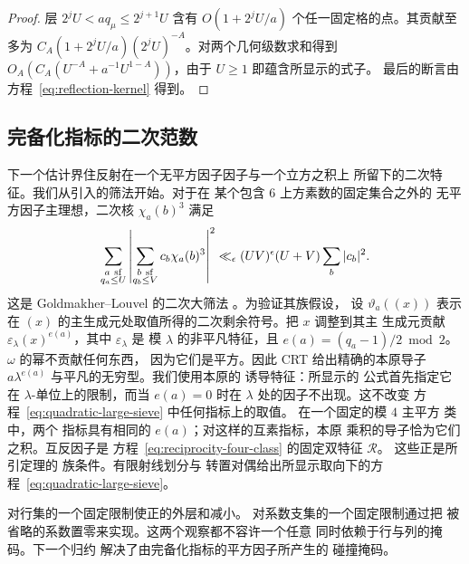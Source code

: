 \begin{proof}
层 $2^jU<a q_\mu\le2^{j+1}U$ 含有
$O(1+2^jU/a)$ 个任一固定格的点。其贡献至多为
$C_A(1+2^jU/a)(2^jU)^{-A}$。对两个几何级数求和得到
$O_A(C_A(U^{-A}+a^{-1}U^{1-A}))$，由于 $U\ge1$ 即蕴含所显示的式子。
最后的断言由方程~\eqref{eq:reflection-kernel} 得到。
\end{proof}

\subsection{完备化指标的二次范数}

下一个估计界住反射在一个无平方因子因子与一个立方之积上
所留下的二次特征。我们从引入的筛法开始。对于在
某个包含 \(6\) 上方素数的固定集合之外的
无平方因子主理想，二次核 \(\chi_a(b)^3\) 满足
\begin{equation}\label{eq:quadratic-large-sieve}
 \sum_{\substack{a\ {\rm sf}\\q_a\le U}}
 \left|\sum_{\substack{b\ {\rm sf}\\q_b\le V}}
             c_b\chi_a(b)^3\right|^2
 \ll_\epsilon (UV)^\epsilon(U+V)\sum_b|c_b|^2.
\end{equation}
这是 Goldmakher--Louvel 的二次大筛法
\cite[定义 1 与定理 1.1]{GL}。为验证其族假设，
设 \(\vartheta_a((x))\) 表示在
\((x)\) 的主生成元处取值所得的二次剩余符号。把 \(x\) 调整到其主
生成元贡献
\(\varepsilon_\lambda(x)^{e(a)}\)，其中 \(\varepsilon_\lambda\) 是
模 \(\lambda\) 的非平凡特征，且
\(e(a)=(q_a-1)/2\bmod2\)。\(\omega\) 的幂不贡献任何东西，
因为它们是平方。因此 CRT 给出精确的本原导子
\(a\lambda^{e(a)}\) 与平凡的无穷型。我们使用本原的
诱导特征：所显示的
公式首先指定它在 \(\lambda\)-单位上的限制，而当
\(e(a)=0\) 时在 \(\lambda\) 处的因子不出现。这不改变
方程~\eqref{eq:quadratic-large-sieve} 中任何指标上的取值。
在一个固定的模 \(4\) 主平方
类中，两个
指标具有相同的 \(e(a)\)；对这样的互素指标，本原
乘积的导子恰为它们之积。互反因子是
方程~\eqref{eq:reciprocity-four-class} 的固定双特征 \(\mathcal R\)。
这些正是所引定理的
族条件。有限射线划分与
转置对偶给出所显示取向下的方程~\eqref{eq:quadratic-large-sieve}。

对行集的一个固定限制使正的外层和减小。
对系数支集的一个固定限制通过把
被省略的系数置零来实现。这两个观察都不容许一个任意
同时依赖于行与列的掩码。下一个归约
解决了由完备化指标的平方因子所产生的
碰撞掩码。

